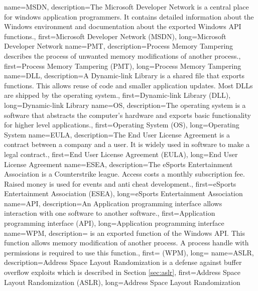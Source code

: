{
  name={MSDN},
  description={The Microsoft Developer Network is a central place for windows application programmers. It contains detailed information about the Windows environment and documentation about the exported Windows API functions.},
  first={Microsoft Developer Network (MSDN)},
  long={Microsoft Developer Network}
}
{
  name={PMT},
  description={Process Memory Tampering describes the process of unwanted memory modifications of another process.},
  first={Process Memory Tampering (PMT)},
  long={Process Memory Tampering}
}
{
  name={DLL},
  description={A Dynamic-link Library is a shared file that exports functions. This allows reuse of code and smaller application updates. Most DLLs are shipped by the operating system.},
  first={Dynamic-link Library (DLL)},
  long={Dynamic-link Library}
}
{
  name={OS},
  description={The operating system is a software that abstracts the computer's hardware and exports basic functionality for higher level applications.},
  first={Operating System (OS)},
  long={Operating System}
}
{
  name={EULA},
  description={The End User License Agreement is a contract between a company and a user. It is widely used in software to make a legal contract.},
  first={End User License Agreement (EULA)},
  long={End User License Agreement}
}
{
  name={ESEA},
  description={The eSports Entertainment Association is a Counterstrike league. Access costs a monthly subscription fee. Raised money is used for events and anti cheat development.},
  first={eSports Entertainment Association (ESEA)},
  long={eSports Entertainment Association}
}
{
  name={API},
  description={An Application programming interface allows interaction with one software to another software.},
  first={Application programming interface (API)},
  long={Application programming interface}
}
{
  name={WPM},
  description={ is an exported function of the Windows API. This function allows memory modification of another process. A process handle with  permissions is required to use this function.},
  first={ (WPM)},
  long={}
}
{
  name={ASLR},
  description={Address Space Layout Randomization is a defense against buffer overflow exploits which is described in Section \ref{sec:aslr}},
  first={Address Space Layout Randomization (ASLR)},
  long={Address Space Layout Randomization}
}
